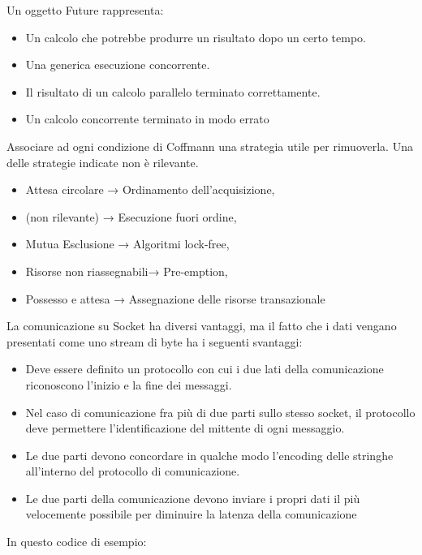 \documentclass{article}
\begin{document}
Un oggetto Future rappresenta:
\begin{itemize}

	\item \checkmark Un calcolo che potrebbe produrre un risultato dopo un certo tempo.
	\item Una generica esecuzione concorrente.
	\item Il risultato di un calcolo parallelo terminato correttamente.
	\item Un calcolo concorrente terminato in modo errato
\end{itemize}

Associare ad ogni condizione di Coffmann una strategia utile per rimuoverla.
   Una delle strategie indicate non è rilevante.

\begin{itemize}
	\item \checkmark Attesa circolare → Ordinamento dell'acquisizione,
	\item \checkmark (non rilevante) → Esecuzione fuori ordine,
	\item \checkmark Mutua Esclusione →  Algoritmi lock-free,
	\item \checkmark Risorse non riassegnabili→  Pre-emption,
	\item \checkmark Possesso e attesa → Assegnazione delle risorse transazionale
\end{itemize}

La comunicazione su Socket ha diversi vantaggi, ma il fatto che i dati vengano presentati come uno stream di byte ha i seguenti svantaggi:

\begin{itemize}
	\item \checkmark Deve essere definito un protocollo con cui i due lati della comunicazione riconoscono l'inizio e la fine dei messaggi.
	\item Nel caso di comunicazione fra più di due parti sullo stesso socket, il protocollo deve permettere l'identificazione del mittente di ogni messaggio.
	\item \checkmark Le due parti devono concordare in qualche modo l'encoding delle stringhe all'interno del protocollo di comunicazione.
	\item Le due parti della comunicazione devono inviare i propri dati il più velocemente possibile per diminuire la latenza della comunicazione
\end{itemize}

In questo codice di esempio:
\end{document}

